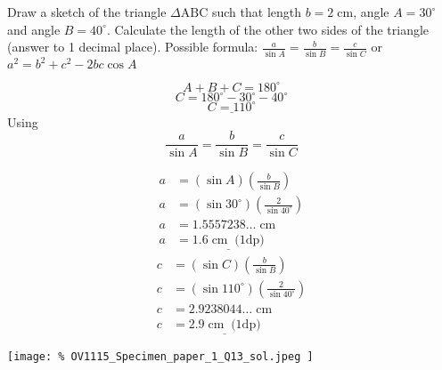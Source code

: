\question  Draw a sketch of the triangle $\Delta \text{ABC}$ such that 
length $b = 2 \; \text{cm}$, angle $A=30^{\circ}$ and angle $B=40^{\circ}$. 
Calculate the length of the other two sides of the triangle 
(answer to 1 decimal place).
\newline
Possible formula: 
\( 
	\frac{a}{\sin{A}} = \frac{b}{\sin{B}} = \frac{c}{\sin{C}} 
\)
 or 
\(
	a^{2} = b^{2} + c^{2} - 2bc \cos{A}
\)
\begin{solution}
	\[
		A + B + C = 180^{\circ}
	\]
	\[
		C = 180^{\circ} - 30^{\circ} - 40^{\circ}
	\]
	\[
		\underline{
			C = 110^{\circ}
		}
	\]
	Using
	\[
		\frac{a}{\sin{A}} = \frac{b}{\sin{B}} = \frac{c}{\sin{C}}
	\]
	\begin{multicols}{2}
		\noindent
		\begin{align*}
			a 
				&= (\sin{A}) \left( \frac{b}{\sin{B}} \right)
				\\
			a 
				&= (\sin{30^{\circ}}) \left( \frac{2}{\sin{40^{\circ}}} \right)
				\\
			a 
				&= 1.5557238\ldots \; \text{cm}
				\\
			a 
				&= \underline{
					1.6 
					\; \text{cm} \;\; \text{(1dp)}
				}
		\end{align*}
		\begin{align*}
			c 
				&= (\sin{C}) \left( \frac{b}{\sin{B}} \right)
				\\
			c 
				&= (\sin{110^{\circ}}) \left( \frac{2}{\sin{40^{\circ}}} \right)
				\\
			c 
				&= 2.9238044\ldots \; \text{cm}
				\\
			c 
				&= \underline{
					2.9
					\; \text{cm} \;\; \text{(1dp)}
				}
		\end{align*}
	\end{multicols}
	\begin{center}
		\texttt{[image: \%
		OV1115\_Specimen\_paper\_1\_Q13\_sol.jpeg
		]}
	\end{center}
\end{solution}

